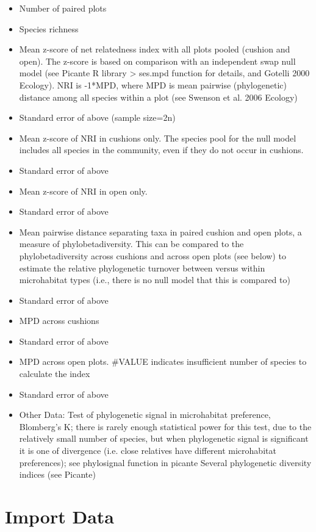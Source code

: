 \documentclass[12pt]{article}
\begin{document}
\begin{itemize}
\item Number of paired plots
\item Species richness
\item Mean z-score of net relatedness index with all plots pooled
  (cushion and open). The z-score is based on comparison with an
  independent swap null model (see Picante R library >  ses.mpd
  function for details, and Gotelli 2000 Ecology).  NRI is -1*MPD,
  where MPD is mean pairwise (phylogenetic) distance among all species
  within a plot (see Swenson et al. 2006 Ecology)
\item Standard error of above (sample size=2n)
\item Mean z-score of NRI in cushions only. The species pool for the
  null model includes all species in the community, even if they do
  not occur in cushions.
\item Standard error of above
\item Mean z-score of NRI in open only.
\item Standard error of above
\item Mean pairwise distance separating taxa in paired cushion and
  open plots, a measure of phylobetadiversity. This can be compared to
  the phylobetadiversity across cushions and across open plots (see
  below) to estimate the relative phylogenetic turnover between versus
  within microhabitat types (i.e., there is no null model that this is
  compared to)
\item Standard error of above
\item MPD across cushions
\item Standard error of above
\item MPD across open plots. #VALUE indicates insufficient number of
  species to calculate the index
\item Standard error of above
\item Other Data:
  \subitem Test of phylogenetic signal in microhabitat preference,
  Blomberg's K; there is rarely enough statistical power for this
  test, due to the relatively small number of species, but when
  phylogenetic signal is significant it is one of divergence
  (i.e. close relatives have different microhabitat preferences); see
  phylosignal function in picante
  \subitem Several phylogenetic diversity indices (see Picante)
\end{itemize}


\section{Import Data}
\end{document}
